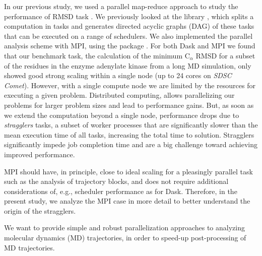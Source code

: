 In our previous study, we used a parallel map-reduce approach to study the performance of RMSD task \cite{Khoshlessan:2017ab, ICCP-2018}. 
We previously looked at the  library \cite{Rocklin:2015aa}, which splits a computation in tasks and generates directed acyclic graphs (DAG) of these tasks that can be executed on a range of schedulers. 
We also implemented the parallel analysis scheme with MPI, using the  package \cite{Dalcin:2011aa, Dalcin:2005aa}. 
For both Dask and MPI we found that our benchmark task, the calculation of the minimum C$_{\alpha}$ RMSD for a
subset of the residues in the enzyme adenylate kinase from a long MD simulation, only showed good strong scaling within a single node (up to 24 cores on \emph{SDSC Comet}).
However, with a single compute node we are limited by the resources for executing a given problem.
Distributed computing, allows parallelizing our problems for larger problem sizes and lead to performance gains.
But, as soon as we extend the computation beyond a single node, performance drops due to \emph{stragglers} tasks, a subset of worker processes that are significantly slower than the mean execution time of all tasks, increasing the total time to solution.
Stragglers significantly impede job completion time and are a big challenge toward achieving improved performance.

 MPI should have, in principle, close to ideal scaling for a pleasingly parallel task such as the analysis of trajectory blocks, and does not require additional considerations of, e.g., scheduler performance as for Dask. 
Therefore, in the present study, we analyze the MPI case in more detail to better understand the origin of the stragglers.

We want to provide simple and robust parallelization approaches to analyzing molecular dynamics (MD) trajectories, in order to speed-up post-processing of MD trajectories.

